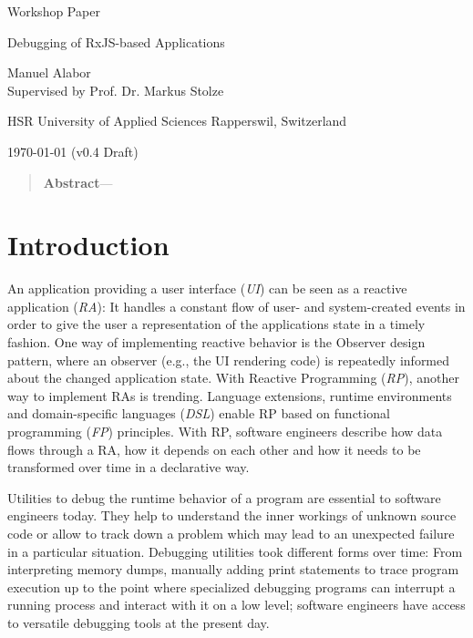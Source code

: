 \documentclass[12pt,a4paper]{article}
\newcommand{\version}{v0.4 Draft}
\begin{document}
\begin{centering}

	\Large{Workshop Paper}
	\par
	\Huge{Debugging of RxJS-based Applications}
	\par
	\vspace{2ex}

	\normalsize{
		Manuel Alabor\\
		Supervised by Prof. Dr. Markus Stolze\\
		\par
		\vspace{2ex}
		HSR University of Applied Sciences Rapperswil, Switzerland\\
		\par
		\vspace{2ex}
		\today{} (\version)
	}
	\par
	\vspace{2ex}

	\begin{quotation}
		\small{
			\noindent\textbf{Abstract}---
		}
		\par
		\vspace{4ex}
	\end{quotation}
\end{centering}

\section{Introduction}

An application providing a user interface (\emph{UI}) can be seen as a reactive application (\emph{RA})\cite{7827078}: It handles a constant flow of user- and system-created events in order to give the user a representation of the applications state in a timely fashion. One way of implementing reactive behavior is the Observer design pattern\cite{gamma1995design}, where an observer (e.g., the UI rendering code) is repeatedly informed about the changed application state. With Reactive Programming (\emph{RP}), another way to implement RAs is trending. Language extensions, runtime environments and domain-specific languages (\emph{DSL}) enable RP based on functional programming (\emph{FP}) principles. With RP, software engineers describe how data flows through a RA, how it depends on each other and how it needs to be transformed over time in a declarative way.

Utilities to debug the runtime behavior of a program are essential to software engineers today. They help to understand the inner workings of unknown source code or allow to track down a problem which may lead to an unexpected failure in a particular situation. Debugging utilities took different forms over time: From interpreting memory dumps, manually adding print statements to trace program execution up to the point where specialized debugging programs can interrupt a running process and interact with it on a low level; software engineers have access to versatile debugging tools at the present day.
\end{document}
